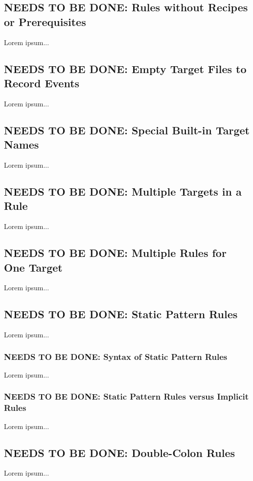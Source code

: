 \documentclass{charun}
\begin{document}
\begin{multicols*}{2}
\color{gray}
\subsection{NEEDS TO BE DONE: Rules without Recipes or Prerequisites}
Lorem ipsum...
\color{black}

\color{gray}
\subsection{NEEDS TO BE DONE: Empty Target Files to Record Events}
Lorem ipsum...
\color{black}

\color{gray}
\subsection{NEEDS TO BE DONE: Special Built-in Target Names}
Lorem ipsum...
\color{black}

\color{gray}
\subsection{NEEDS TO BE DONE: Multiple Targets in a Rule}
Lorem ipsum...
\color{black}

\color{gray}
\subsection{NEEDS TO BE DONE: Multiple Rules for One Target}
Lorem ipsum...
\color{black}

\color{gray}
\subsection{NEEDS TO BE DONE: Static Pattern Rules}
Lorem ipsum...
\color{black}

\color{gray}
\subsubsection{NEEDS TO BE DONE: Syntax of Static Pattern Rules}
Lorem ipsum...
\color{black}

\color{gray}
\subsubsection{NEEDS TO BE DONE: Static Pattern Rules versus Implicit Rules}
Lorem ipsum...
\color{black}

\color{gray}
\subsection{NEEDS TO BE DONE: Double-Colon Rules}
Lorem ipsum...
\color{black}


\end{multicols*}
\end{document}

